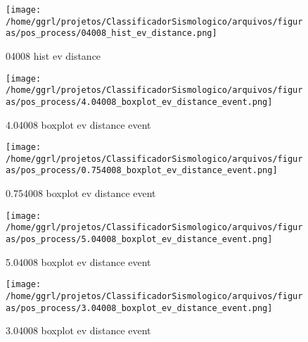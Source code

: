                     \begin{figure}[H]
                        \centering
                        \texttt{[image: /home/ggrl/projetos/ClassificadorSismologico/arquivos/figuras/pos\_process/04008\_hist\_ev\_distance.png]}
                        \caption{04008 hist ev distance}
                        \label{fig:04008_hist_ev_distance}
                    \end{figure}
                

                    \begin{figure}[H]
                        \centering
                        \texttt{[image: /home/ggrl/projetos/ClassificadorSismologico/arquivos/figuras/pos\_process/4.04008\_boxplot\_ev\_distance\_event.png]}
                        \caption{4.04008 boxplot ev distance event}
                        \label{fig:4.04008_boxplot_ev_distance_event}
                    \end{figure}
                

                    \begin{figure}[H]
                        \centering
                        \texttt{[image: /home/ggrl/projetos/ClassificadorSismologico/arquivos/figuras/pos\_process/0.754008\_boxplot\_ev\_distance\_event.png]}
                        \caption{0.754008 boxplot ev distance event}
                        \label{fig:0.754008_boxplot_ev_distance_event}
                    \end{figure}
                

                    \begin{figure}[H]
                        \centering
                        \texttt{[image: /home/ggrl/projetos/ClassificadorSismologico/arquivos/figuras/pos\_process/5.04008\_boxplot\_ev\_distance\_event.png]}
                        \caption{5.04008 boxplot ev distance event}
                        \label{fig:5.04008_boxplot_ev_distance_event}
                    \end{figure}
                

                    \begin{figure}[H]
                        \centering
                        \texttt{[image: /home/ggrl/projetos/ClassificadorSismologico/arquivos/figuras/pos\_process/3.04008\_boxplot\_ev\_distance\_event.png]}
                        \caption{3.04008 boxplot ev distance event}
                        \label{fig:3.04008_boxplot_ev_distance_event}
                    \end{figure}
                

